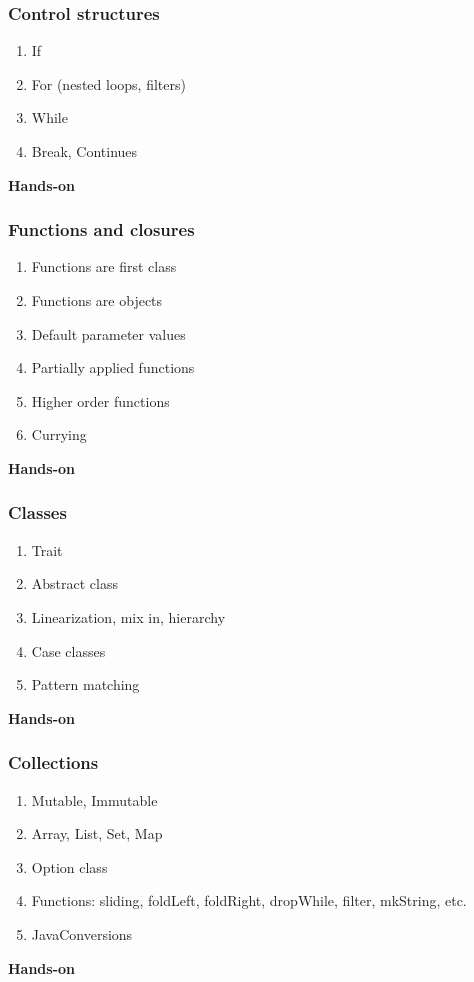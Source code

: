 \documentclass{beamer}
\begin{document}
\begin{frame}
	\frametitle{Control structures}
	\begin{enumerate}
		\item If 
		\item For (nested loops, filters)
		\item While
		\item Break, Continues
	\end{enumerate}
	\begin{center}
	{\huge {\bf Hands-on}}
	\end{center}
\end{frame}

\begin{frame}
	\frametitle{Functions and closures}
	\begin{enumerate}
		\item Functions are first class
		\item Functions are objects
		\item Default parameter values
		\item Partially applied functions
		\item Higher order functions
		\item Currying
	\end{enumerate}
	\begin{center}
	{\huge {\bf Hands-on}}
	\end{center}
\end{frame}

\begin{frame}
	\frametitle{Classes}
	\begin{enumerate}
		\item Trait
		\item Abstract class
		\item Linearization, mix in, hierarchy
		\item Case classes
		\item Pattern matching
	\end{enumerate}
	\begin{center}
	{\huge {\bf Hands-on}}
	\end{center}
\end{frame}

\begin{frame}
	\frametitle{Collections}
	\begin{enumerate}
		\item Mutable, Immutable
		\item Array, List, Set, Map
		\item Option class
		\item Functions: sliding, foldLeft, foldRight,
	dropWhile, filter, mkString, etc.
		\item JavaConversions
	\end{enumerate}
	\begin{center}
	{\huge {\bf Hands-on}}
	\end{center}
\end{frame}
\end{document}
